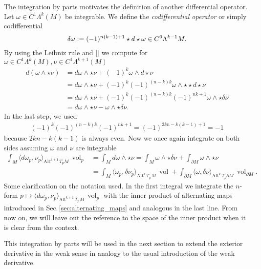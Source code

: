 \documentclass[12pt,a4paper]{article}
\numberwithin{equation}{subsection}
\numberwithin{lemma}{subsection}
\theoremstyle{definition}
\DeclareMathOperator{\vol}{vol}
\newcommand{\alternating}[2]{ {\text{Alt}^{#1}\,#2} }
\begin{document}
The integration by parts motivates the definition of another differential
operator. Let $\omega \in C^1 \Lambda^k (M)$ be integrable. 
We define the \textit{codifferential operator} or simply 
codifferential 
\begin{align*}
    \delta \omega \vcentcolon= 
    (-1)^{n(k-1)+1} \star d \star \omega \in C^0 \Lambda^{k-1} M.
\end{align*}
By using the Leibniz rule and \ref{} we compute for $\omega \in 
C^1 \Lambda^k (M), \nu \in C^1 \Lambda^{k+1} (M)$
\begin{align*}
    d(\omega \wedge \star \nu) 
    &= d\omega \wedge \star \nu + 
        (-1)^k \omega \wedge d \star \nu 
    \\ &= d\omega \wedge \star \nu + (-1)^k (-1)^{(n-k)k} 
        \omega \wedge \star \star d \star \nu 
    \\ &= d\omega \wedge \star \nu + (-1)^k (-1)^{(n-k)k} (-1)^{nk + 1}
        \omega \wedge \star \delta \nu 
    \\ &= d\omega \wedge \star \nu -
        \omega \wedge \star \delta \nu.
\end{align*}
In the last step, we used 
\begin{align*}
    (-1)^k (-1)^{(n-k)k} (-1)^{nk + 1} 
    = (-1)^{2kn - k(k-1)+1} = -1
\end{align*}
because $2kn - k(k-1)$ is always even. 
Now we once again integrate on both sides assuming $\omega$ and $\nu$ are 
integrable
\begin{align*}
    \int_M \langle d\omega_p , \nu_p \rangle_{\alternating{k+1}{T_p M}} \,\vol_p
    &= \int_M d\omega \wedge \star \nu 
    = \int_M \omega \wedge \star \delta \nu  
        + \int_{\partial M} \omega \wedge \star \nu
    \\ &= \int_M \langle \omega_p , \delta \nu_p \rangle
        _{\alternating{k}{T_p M}} \, \vol
        + \int_{\partial M} \langle \omega , \delta \nu 
        \rangle_{\alternating{k}{T_p \partial M}} \, \vol_{\partial M}.
\end{align*}
Some clarification on the notation used. In the first integral we integrate 
the $n$-form $p \mapsto 
\langle d\omega_p , \nu_p \rangle_{\alternating{k+1}{T_p M}} \, \vol_p$
with the inner product of alternating maps introduced in 
Sec.\,\ref{sec:alternating_maps} and analogous in the last line. 
From now on, we will leave out the reference to the space of the inner product
when it is clear from the context.

This integration by parts will be used in the next section to extend the 
exterior derivative in the weak sense in analogy to the usual introduction 
of the weak derivative.
\end{document}
